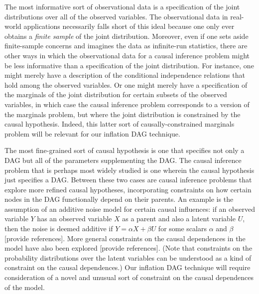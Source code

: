 The most informative sort of observational data is a specification of the joint distributions over all of the observed variables.  The observational data in real-world applications necessarily falls short of this ideal because one only ever obtains a {\em finite sample} of the joint distribution.  Moreover, even if one sets aside finite-sample concerns and imagines the data as infinite-run statistics, there are other ways in which the observational data for a causal inference problem might be less informative than a specification of the joint distribution.  For instance, one might merely have a description of the conditional independence relations that hold among the observed variables.  Or one might merely have a specification of the marginals of the joint distribution for certain subsets of the observed variables, in which case the causal inference problem corresponds to a version of the marginals problem, but where the joint distribution is constrained by the causal hypothesis.  Indeed, this latter sort of causally-constrained marginals problem 
 will be relevant for our inflation DAG technique.  

The most fine-grained sort of causal hypothesis is one that specifies not only a DAG but all of the parameters supplementing the DAG.  The causal inference problem that is perhaps most widely studied is one wherein the causal hypothesis just specifies a DAG.  Between these two cases are causal inference problems that explore more refined causal hypotheses, incorporating constraints on how  certain nodes in the DAG functionally depend on their parents.  An example is the assumption of an additive noise model for certain causal influences: if an observed variable $Y$ has an observed variable $X$ as a parent and also a latent variable $U$, then the noise is deemed additive if $Y=\alpha X + \beta U$ for some scalars $\alpha$ and $\beta$ [provide references].  More general constraints on the causal dependences in the model have also been explored [provide references].  (Note that constraints on the probability distributions over the latent variables can be understood as a kind of constraint on the causal dependences.)
Our inflation DAG technique will require consideration of a novel and unusual sort of constraint on the causal dependences of the model. 

